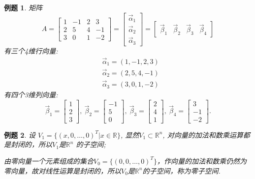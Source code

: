 \documentclass[a4paper]{book}
\newtheorem{eg}{例题}[chapter]
\begin{document}
\begin{eg}
矩阵$$A=\begin{bmatrix}1&-1&2&3\\2&5&4&-1\\3&0&1&-2\end{bmatrix}=\begin{bmatrix}
\vec{\alpha}_1\\ \vec{\alpha}_2\\ \vec{\alpha}_3\end{bmatrix}=\begin{bmatrix} \vec{\beta}_1&\vec{\beta}_2&\vec{\beta}_3&\vec{\beta}_4\end{bmatrix}$$
有三个4维行向量:
\begin{displaymath}\begin{aligned}
&\vec{\alpha}_1=(1,-1,2,3)\\
&\vec{\alpha}_2=(2,5,4,-1)\\
&\vec{\alpha}_3=(3,0,1,-2)\end{aligned}
\end{displaymath}
有四个3维列向量:
\begin{displaymath}
\vec{\beta}_1=\begin{bmatrix}1\\2\\3\end{bmatrix},\ \vec{\beta}_2=\begin{bmatrix}-1\\5\\0\end{bmatrix},\ \vec{\beta}_3=\begin{bmatrix}2\\4\\1\end{bmatrix},\ \vec{\beta}_4=\begin{bmatrix}3\\-1\\-2\end{bmatrix}.
\end{displaymath}
\end{eg}

\begin{eg}
设 $V_1=\{(x,0,\dots,0)^T|x\in\mathbb{R}\}$, 显然$V_1\subset \mathbb{R}^n$, 对向量的加法和数乘运算都是封闭的，所以$V_1$是$\mathbb{R}^n$ 的子空间;

由零向量一个元素组成的集合$V_0=\{(0,0,\dots, 0)^T\}$，作向量的加法和数乘仍然为零向量，故对线性运算是封闭的，所以$V_0$是$\mathbb{R}^n$的子空间，称为零子空间.
\end{eg}
\end{document}
